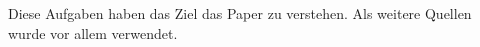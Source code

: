Diese Aufgaben haben das Ziel das Paper \cite{boalch} zu verstehen. Als weitere
Quellen wurde vor allem \cite{thboalch} verwendet.
